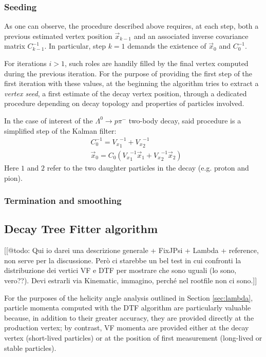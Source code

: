 \subsubsection{Seeding}

As one can observe, the procedure described above requires, at each step, both a previous estimated vertex position $\vec{x}_{k-1}$ and an associated inverse covariance matrix $C_{k-1}^{-1}$. In particular, step $k=1$ demands the existence of $\vec{x}_0$ and $C_{0}^{-1}$.

For iterations $i>1$, such roles are handily filled by the final vertex computed during the previous iteration. For the purpose of providing the first step of the first iteration with these values, at the beginning the algorithm tries to extract a \textit{vertex seed}, a first estimate of the decay vertex position, through a dedicated procedure depending on decay topology and properties of particles involved.

In the case of interest of the $\Lambda^0 \rightarrow p \pi^-$ two-body decay, said procedure is a simplified step of the Kalman filter:
\begin{subequations}
\begin{align}
	&C^{-1}_0 = {V_x}^{-1}_1 + {V_x}^{-1}_2 \\
	&\vec{x}_0 = C_0 \left(
		{V_x}^{-1}_1 \vec{x}_1 + {V_x}^{-1}_2 \vec{x}_2
	\right)
\end{align}
\end{subequations}
Here $1$ and $2$ refer to the two daughter particles in the decay (e.g. proton and pion).

\subsubsection{Termination and smoothing}


\subsection{Decay Tree Fitter algorithm}
[[@todo: Qui io darei una descrizione generale + FixJPsi + Lambda + reference, non serve per la discussione. Però ci starebbe un bel test in cui confronti la distribuzione dei vertici VF e DTF per mostrare che sono uguali (lo sono, vero??). Devi estrarli via Kinematic, immagino, perché nel rootfile non ci sono.]]

For the purposes of the helicity angle analysis outlined in Section \ref{sec:lambda}, particle momenta computed with the DTF algorithm are particularly valuable because, in addition to their greater accuracy, they are provided directly at the production vertex;
by contrast, VF momenta are provided either at the decay vertex (short-lived particles) or at the position of first measurement (long-lived or stable particles).

